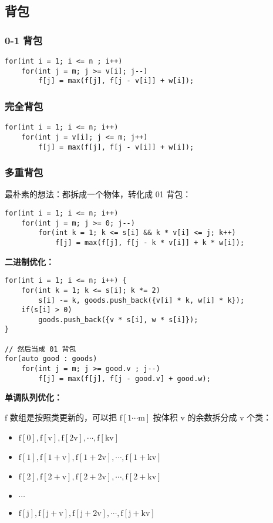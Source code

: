 \documentclass[UTF8]{article}
\begin{document}
\subsection{背包}
\subsubsection{0-1 背包}
\begin{lstlisting}[caption=0-1 背包滚动优化写法]
for(int i = 1; i <= n ; i++)
	for(int j = m; j >= v[i]; j--)
		f[j] = max(f[j], f[j - v[i]] + w[i]);
\end{lstlisting}


\subsubsection{完全背包}
\begin{lstlisting}[caption=完全背包]
for(int i = 1; i <= n; i++)
	for(int j = v[i]; j <= m; j++)
		f[j] = max(f[j], f[j - v[i]] + w[i]);
\end{lstlisting}


\subsubsection{多重背包}
最朴素的想法：都拆成一个物体，转化成 01 背包：
\begin{lstlisting}[caption=多重背包朴素写法]
for(int i = 1; i <= n; i++)
	for(int j = m; j >= 0; j--)
		for(int k = 1; k <= s[i] && k * v[i] <= j; k++)
			f[j] = max(f[j], f[j - k * v[i]] + k * w[i]);
\end{lstlisting}

\noindent \textbf{二进制优化：}
\begin{lstlisting}[caption=多重背包二进制优化]
for(int i = 1; i <= n; i++) {
	for(int k = 1; k <= s[i]; k *= 2)
		s[i] -= k, goods.push_back({v[i] * k, w[i] * k});
	if(s[i] > 0)
		goods.push_back({v * s[i], w * s[i]});
}

// 然后当成 01 背包
for(auto good : goods) 
	for(int j = m; j >= good.v ; j--)
		f[j] = max(f[j], f[j - good.v] + good.w);
\end{lstlisting}

\noindent \textbf{单调队列优化：}

$\mathrm{f}$ 数组是按照类更新的，可以把 $\mathrm{f[1 \cdots m]}$ 按体积 $\mathrm{v}$ 的余数拆分成 $\mathrm{v}$ 个类：

\begin{itemize}
	\item $\mathrm{f[0], f[v], f[2v], \cdots, f[kv]}$
	\item $\mathrm{f[1], f[1 + v], f[1 + 2v], \cdots, f[1 + kv]}$
	\item $\mathrm{f[2], f[2 + v], f[2 + 2v], \cdots, f[2 + kv]}$
	\item $\mathrm{\cdots}$
	\item $\mathrm{f[j], f[j + v], f[j + 2v], \cdots, f[j + kv]}$
\end{itemize}
\end{document}
